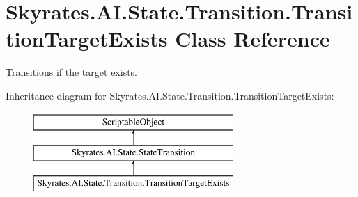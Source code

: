\hypertarget{class_skyrates_1_1_a_i_1_1_state_1_1_transition_1_1_transition_target_exists}{\section{Skyrates.\-A\-I.\-State.\-Transition.\-Transition\-Target\-Exists Class Reference}
\label{class_skyrates_1_1_a_i_1_1_state_1_1_transition_1_1_transition_target_exists}
}


Transitions if the target exists.  


Inheritance diagram for Skyrates.\-A\-I.\-State.\-Transition.\-Transition\-Target\-Exists\-:\begin{figure}[H]
\begin{center}
\leavevmode
\includegraphics[height=3.000000cm]{class_skyrates_1_1_a_i_1_1_state_1_1_transition_1_1_transition_target_exists}
\end{center}
\end{figure}
